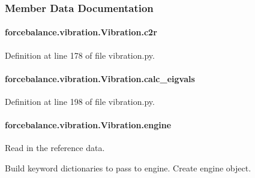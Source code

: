 \subsubsection{Member Data Documentation}
\hypertarget{classforcebalance_1_1vibration_1_1Vibration_aadf038fadc7a0d1ca03ba225ebf7edb6}{
\paragraph[{c2r}]{\setlength{\rightskip}{0pt plus 5cm}forcebalance.\-vibration.\-Vibration.\-c2r}}\label{classforcebalance_1_1vibration_1_1Vibration_aadf038fadc7a0d1ca03ba225ebf7edb6}


Definition at line 178 of file vibration.\-py.

\hypertarget{classforcebalance_1_1vibration_1_1Vibration_a465150971ac24aabbf40b1f50b304f6e}{
\paragraph[{calc\-\_\-eigvals}]{\setlength{\rightskip}{0pt plus 5cm}forcebalance.\-vibration.\-Vibration.\-calc\-\_\-eigvals}}\label{classforcebalance_1_1vibration_1_1Vibration_a465150971ac24aabbf40b1f50b304f6e}


Definition at line 198 of file vibration.\-py.

\hypertarget{classforcebalance_1_1vibration_1_1Vibration_ad72d6182d9f2d2a1ba97030635fbdb3d}{
\paragraph[{engine}]{\setlength{\rightskip}{0pt plus 5cm}forcebalance.\-vibration.\-Vibration.\-engine}}\label{classforcebalance_1_1vibration_1_1Vibration_ad72d6182d9f2d2a1ba97030635fbdb3d}


Read in the reference data. 

Build keyword dictionaries to pass to engine. Create engine object. 

